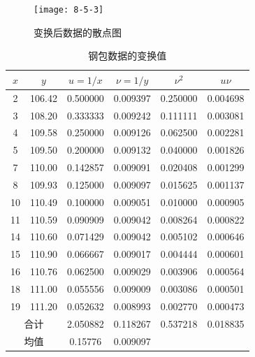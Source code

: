 \begin{figure}[htb]
    \centering
    \texttt{[image: 8-5-3]}
    \caption{变换后数据的散点图}
    \label{fig:8.5.3}
\end{figure}
\begin{table}[!htbp]
  \renewcommand*{\arraystretch}{1.5}
    \centering
    \caption{钢包数据的变换值}
    \begin{tabular}{cccccc}
        \toprule
     $x$      &  $y$      &  $u =1/x$  &  $\nu =1/y$  &  $\nu^2$  &  $u\nu$  \\\midrule
        2     & 106.42  & 0.500000  & 0.009397  & 0.250000  & 0.004698  \\
        3     & 108.20  & 0.333333  & 0.009242  & 0.111111  & 0.003081  \\
        4     & 109.58  & 0.250000  & 0.009126  & 0.062500  & 0.002281  \\
        5     & 109.50  & 0.200000  & 0.009132  & 0.040000  & 0.001826  \\
        7     & 110.00  & 0.142857  & 0.009091  & 0.020408  & 0.001299  \\
        8     & 109.93  & 0.125000  & 0.009097  & 0.015625  & 0.001137  \\
        10    & 110.49  & 0.100000  & 0.009051  & 0.010000  & 0.000905  \\
        11    & 110.59  & 0.090909  & 0.009042  & 0.008264  & 0.000822  \\
        14    & 110.60  & 0.071429  & 0.009042  & 0.005102  & 0.000646  \\
        15    & 110.90  & 0.066667  & 0.009017  & 0.004444  & 0.000601  \\
        16    & 110.76  & 0.062500  & 0.009029  & 0.003906  & 0.000564  \\
        18    & 111.00  & 0.055556  & 0.009009  & 0.003086  & 0.000501  \\
        19    & 111.20  & 0.052632  & 0.008993  & 0.002770  & 0.000473  \\
        \multicolumn{2}{c}{合计} & 2.050882  & 0.118267  & 0.537218  & 0.018835  \\
        \multicolumn{2}{c}{均值} & 0.15776 & 0.009097 &       &  \\\bottomrule
    \end{tabular}%
    \label{tab:8.5.2}%
\end{table}%

